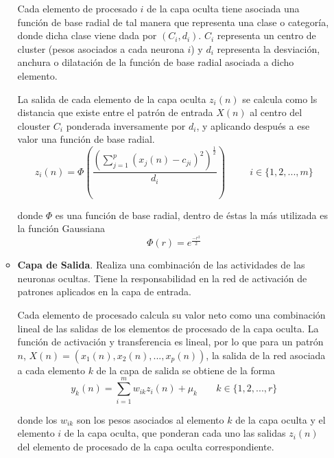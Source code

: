 \documentclass[letterpaper,11pt]{article}
\begin{document}
\begin{enumerate}
\begin{itemize}
        Cada elemento de procesado $i$ de la capa oculta tiene asociada una 
        función de base radial de tal manera que representa una clase o 
        categoría, donde dicha clase viene dada por $(C_i, d_i)$. $C_i$
        representa un centro de cluster (pesos asociados a cada neurona $i$) y 
        $d_i$ representa la desviación, anchura o dilatación de la función de 
        base radial asociada a dicho elemento. 

        La salida de cada elemento de la capa oculta $z_i (n)$ se calcula como 
        ls distancia que existe entre el patrón de entrada $X (n)$ al centro del 
        clouster $C_i$ ponderada inversamente por $d_i$, y aplicando después a 
        ese valor una función de base radial.
        \begin{equation*}
            z_i (n) = 
            \Phi \left(\frac{\left( \sum^p_{j=1} \left( x_j (n) - c_{ji} 
                                                 \right)^2 \right)^{\frac{1}{2}}}
                            {d_i} \right) \; \; \; \; \; \; \; \; \; 
            i \in \{1, 2, ..., m\}
        \end{equation*}

        donde $\Phi$ es una función de base radial, dentro de éstas la más 
        utilizada es la función Gaussiana 
        \begin{equation*}
            \Phi (r) = e^{\frac{-r^2}{2}}
        \end{equation*}

        \item \textbf{Capa de Salida}. Realiza una combinación de las actividades 
        de las neuronas ocultas. Tiene la responsabilidad en la red de activación 
        de patrones aplicados en la capa de entrada. 

        Cada elemento de procesado calcula su valor neto como una combinación
        lineal de las salidas de los elementos de procesado de la capa oculta.
        La función de activación y transferencia es lineal, por lo que para un 
        patrón $n$, $X(n) = (x_1 (n), x_2 (n), ..., x_p (n))$, la salida de la 
        red asociada a cada elemento $k$ de la capa de salida se obtiene de la 
        forma 
        \begin{equation*}
            y_k (n) = \sum^m_{i=1} w_{ik} z_i (n) + \mu_k \; \; \; \; \; \; \;
            k \in \{1, 2, ..., r\}
        \end{equation*}

        donde los $w_{ik}$ son los pesos asociados al elemento $k$ de la capa 
        oculta y el elemento $i$ de la capa oculta, que ponderan cada uno las 
        salidas $z_i (n)$ del elemento de procesado de la capa oculta 
        correspondiente. 


\end{itemize}
\end{enumerate}
\end{document}
